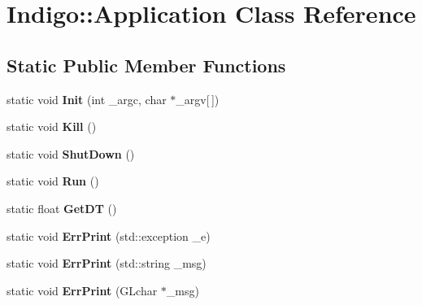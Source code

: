 \hypertarget{class_indigo_1_1_application}{}\section{Indigo\+:\+:Application Class Reference}
\label{class_indigo_1_1_application}
\subsection*{Static Public Member Functions}
\begin{DoxyCompactItemize}
\item 
\mbox{\label{class_indigo_1_1_application_a1187d12c4cfd234da50c460eb8f207d7}} 
static void {\bfseries Init} (int \+\_\+argc, char $\ast$\+\_\+argv\mbox{[}$\,$\mbox{]})
\item 
\mbox{\label{class_indigo_1_1_application_ad9d4706c035d5064ed52eafa9868cf60}} 
static void {\bfseries Kill} ()
\item 
\mbox{\label{class_indigo_1_1_application_ab64b70bb88997428bb5b49eaa013228f}} 
static void {\bfseries Shut\+Down} ()
\item 
\mbox{\label{class_indigo_1_1_application_aaf09cd6cb412086dc039e28cdb059f0d}} 
static void {\bfseries Run} ()
\item 
\mbox{\label{class_indigo_1_1_application_ab0c5855e6fad35691820e44f48eeb319}} 
static float {\bfseries Get\+DT} ()
\item 
\mbox{\label{class_indigo_1_1_application_a7a99ff8c0bd7d815c9596a4ac7a97947}} 
static void {\bfseries Err\+Print} (std\+::exception \+\_\+e)
\item 
\mbox{\label{class_indigo_1_1_application_a60e0940871b9408b7f8fcc509715e491}} 
static void {\bfseries Err\+Print} (std\+::string \+\_\+msg)
\item 
\mbox{\label{class_indigo_1_1_application_a4a09305047e287df89e531fe00e88643}} 
static void {\bfseries Err\+Print} (G\+Lchar $\ast$\+\_\+msg)
\end{DoxyCompactItemize}
